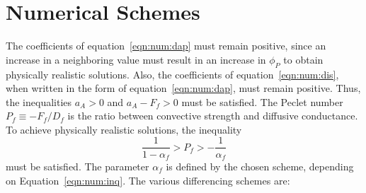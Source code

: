 \section{Numerical Schemes}

The coefficients of equation~\eqref{eqn:num:dap} must remain positive,
since an increase in a neighboring value must result in an increase in
$\phi_P$ to obtain physically realistic solutions.  Also, the
coefficients of equation~\eqref{eqn:num:dis}, when written in the form
of equation~\eqref{eqn:num:dap}, must remain positive.  Thus, the
inequalities $a_A > 0$ and $a_A - F_f>0$ must be satisfied.  The
Peclet number $P_f \equiv -F_f / D_f$ is the ratio between convective
strength and diffusive conductance.  To achieve physically realistic
solutions, the inequality
\begin{equation}
\frac{1}{1-\alpha_f} > P_f > -\frac{1}{\alpha_f}
\label{eqn:num:inq}
\end{equation}
must be satisfied.
The parameter $\alpha_f$ is defined by the chosen scheme, depending
on Equation~\eqref{eqn:num:inq}. The various
differencing schemes are:
